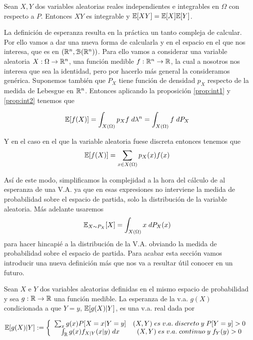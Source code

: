     \begin{teorema}
     Sean $X,Y$ dos variables aleatorias reales independientes e integrables en $\Omega$ con respecto a $P$. Entonces $XY$ es integrable y $\mathbb{E}[XY] = \mathbb{E}[X]\mathbb{E}[Y]$. 
     \end{teorema}
     

     La definición de esperanza resulta en la práctica un tanto compleja de calcular. Por ello vamos a dar una nueva forma de calcularla y en el espacio en el que nos interesa, que es en $(\mathbb{R}^n,\mathcal{B}(\mathbb{R}^n))$. Para ello vamos a considerar una variable aleatoria $X:\Omega \to \mathbb{R}^n$, una función medible $f:\mathbb{R}^n \to \mathbb{R}$, la cual a nosotros nos interesa que sea la identidad, pero por hacerlo más general la consideramos genérica. Suponemos también que $P_X$ tiene función de densidad $p_X$ respecto de la medida de Lebesgue en $\mathbb{R}^n$. Entonces aplicando la proposición \ref{prop:int1} y \ref{prop:int2} tenemos que 
     
    \begin{equation}
         \mathbb{E}[f(X)]= \int_{X(\Omega)} p_X f \; d\lambda^n =  \int_{X(\Omega)} f \; d P_X
     \end{equation}
     
     \noindent Y en el caso en el que la variable aleatoria fuese discreta entonces tenemos que 
     \begin{equation}
         \mathbb{E}[f(X)] = \sum_{x\in X(\Omega)} p_X(x)f(x)
     \end{equation}
     
    Así de este modo, simplificamos la complejidad a la hora del cálculo de al esperanza de una V.A. ya que en esas expresiones no interviene la medida de probabilidad sobre el espacio de partida, solo la distribución de la variable aleatoria. Más adelante usaremos 
    $$\mathbb{E}_{ X \sim P_X}[X] = \int_{X(\Omega)}x \; dP_X(x)$$
    \noindent para hacer hincapié a la distribución de la V.A. obviando la medida de probabilidad sobre el espacio de partida. Para acabar esta sección vamos introducir una nueva definición más que nos va a resultar útil conocer en un futuro. 
    
    \begin{definicion} 
    Sean $X$ e $Y$ dos variables aleatorias definidas en el mismo espacio de probabilidad y sea $g:\mathbb{R} \to \mathbb{R}$ una función medible. La esperanza de la v.a. $g(X)$ condicionada a que $Y=y$, $\mathbb{E}[g(X)|Y]$, es una v.a. real dada por
    
    \begin{equation}
        \mathbb{E}[g(X)|Y] := 
        \left\{
        \begin{array}{cc}
             \sum_x g(x)P[X=x|Y=y] & (X,Y) \; es \; v.a. \; discreto \; y \; P[Y=y] > 0  \\
             \int_{\mathbb{R}} g(x)f_{X|Y}(x|y) \; dx & (X,Y) \; es \; v.a. \; continuo \; y \; f_Y(y) > 0
        \end{array}
        \right.
    \end{equation}
    \end{definicion}
    
    

    

\endinput
